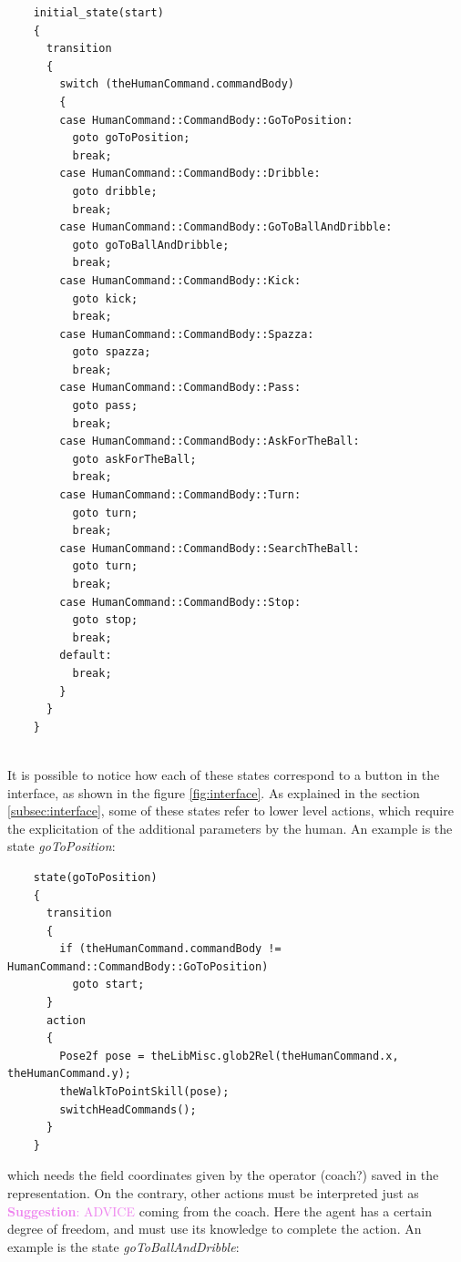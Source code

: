 \documentclass[a4paper, onecolumn, 12pt]{article}
\newcommand\suggestion[1]{\textcolor{violet}{\textbf{Suggestion}: #1}}
\begin{document}
\begin{verbatim}
    initial_state(start)
    {
      transition
      {
        switch (theHumanCommand.commandBody)
        { 
        case HumanCommand::CommandBody::GoToPosition:
          goto goToPosition;
          break;
        case HumanCommand::CommandBody::Dribble:
          goto dribble;
          break;
        case HumanCommand::CommandBody::GoToBallAndDribble:
          goto goToBallAndDribble;
          break;
        case HumanCommand::CommandBody::Kick:
          goto kick;
          break;
        case HumanCommand::CommandBody::Spazza:
          goto spazza;
          break;
        case HumanCommand::CommandBody::Pass:
          goto pass;
          break;
        case HumanCommand::CommandBody::AskForTheBall:
          goto askForTheBall;
          break;
        case HumanCommand::CommandBody::Turn:
          goto turn;
          break;
        case HumanCommand::CommandBody::SearchTheBall:
          goto turn;
          break;
        case HumanCommand::CommandBody::Stop:
          goto stop;
          break;
        default:
          break;
        }
      }
    }
   
\end{verbatim}

It is possible to notice how each of these states correspond to a button in the interface,
as shown in the figure \ref{fig:interface}.
As explained in the section \ref{subsec:interface}, some of these states refer to lower 
level actions, which require the explicitation of the additional parameters by the human.
An example is the state \textit{goToPosition}:

\begin{verbatim}
    state(goToPosition)
    {
      transition
      {
        if (theHumanCommand.commandBody != HumanCommand::CommandBody::GoToPosition)
          goto start;
      }
      action
      {
        Pose2f pose = theLibMisc.glob2Rel(theHumanCommand.x, theHumanCommand.y);
        theWalkToPointSkill(pose);
        switchHeadCommands();
      }
    }

\end{verbatim}

which needs the field coordinates given by the operator (coach?) saved in the representation.
On the contrary, other actions must be interpreted just as \suggestion{ADVICE} coming 
from the coach. Here the agent has a certain degree of freedom, and must use 
its knowledge to complete the action. An example is the state \textit{goToBallAndDribble}:
\end{document}
